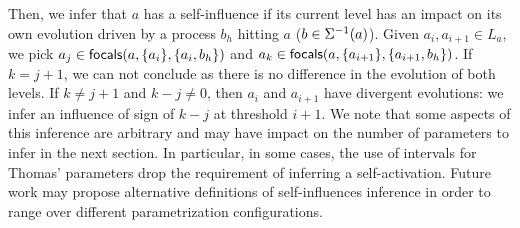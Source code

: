 Then, we infer that $a$ has a self-influence if its current level has an impact on its own evolution
driven by a process $b_h$ hitting $a$ ($b\in\Sigma^{-1}(a)$).
Given $a_i,a_{i+1}\in L_a$, we pick $a_j\in\mathsf{focals}(a,\{a_i\},\{a_i,b_h\})$ and
$a_k\in\mathsf{focals}(a,\{a_{i+1}\},\{a_{i+1},b_h\})$.
If $k=j+1$, we can not conclude as there is no difference in the evolution of both levels.
If $k\neq j+1$ and $k-j\neq 0$, then $a_i$ and $a_{i+1}$ have divergent evolutions: we infer an
influence of sign of $k-j$ at threshold $i+1$.
We note that some aspects of this inference are arbitrary and may have impact on the number of
parameters to infer in the next section.
In particular, in some cases, the use of intervals for Thomas' parameters drop the requirement of
inferring a self-activation.
Future work may propose alternative definitions of self-influences inference in order to range over
different parametrization configurations.

\begin{comment}
a global overview of the evolution of each level
of $a$ w.r.t. a configuration $\sigma\in\configs a$.
The evolution of $a_i$ in the context $\ctx(\sigma\{a_i\})$ is given by the function
$\epsilon(a_i,\sigma)$ (\pref{eq:epsilon}) which returns $\varnothing$ if there is no action
possible, $+$ (resp. $-$) if all actions makes $a_i$ bounce to a higher (resp. lower) level,
and $\pm$ if both evolutions are possible.
\begin{equation}
\epsilon(a_i, \sigma) \DEF
\begin{cases}
\varnothing & \text{if }\focals(a,\{a_i\},\ctx(\sigma\{a_i\}))=\{ a_i \} \\
+ &  \text{if }\focals(a, \{a_i\},\ctx(\sigma\{a_i\})) = \{ a_{i+1} \}\\
- &  \text{if }\focals(a, \{a_i\},\ctx(\sigma\{a_i\})) = \{ a_{i-1} \}\\
\pm & \text{otherwise.}
\end{cases}
\label{eq:epsilon}
\end{equation}
We infer the self-influence of $a$ by checking one of the following three cases.
First, if there exists $a_i,a_j\in L_a, i <j$ such that $\epsilon(a_i,\sigma)$ and
$\epsilon(a_j,\sigma)$ are of opposite sign, then $a$ has a self-influence of the sign of the latter
$\epsilon$ (with a maximum threshold $k=j$).
Second, we look at the evolution at the limit levels of $a$:
if $\epsilon(a_0,\sigma)=\bar s$ or $\epsilon(a_{l_a},\sigma)=s$, we infer an influence of sign $s$
with a threshold $k=l_a$.
We note that this case can only apply for negative interactions (as $\epsilon(a_0,\sigma)$ (resp.
$\epsilon(a_{l_a},\sigma)$ can never be negative (resp. positive)).
Third, if $\forall a_i\in L_a$, $\epsilon(a_i,\sigma)$ is either $\varnothing$ or of sign $s$, we
ensure there exists $a_j\in L_a$ such that $\epsilon(a_j,\sigma)=s$ and we infer a self-influence of
sign $s$ and threshold $k=j$.
\end{comment}


